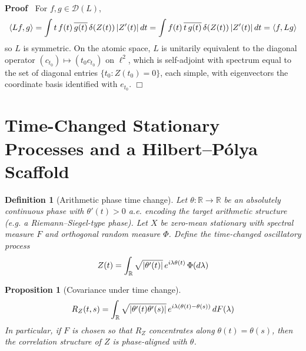 \documentclass{article}
\newenvironment{proof}{\noindent\textbf{Proof\ }}{\hspace*{\fill}$\Box$\medskip}
\newtheorem{definition}{Definition}
\newtheorem{proposition}{Proposition}
{\theorembodyfont{\rmfamily}\newtheorem{remark}{Remark}}
\begin{document}
\begin{proof}
  For $f, g \in \mathcal{D} (L)$,
  \begin{equation}
    \langle Lf, g \rangle = \int t \hspace{0.17em} f (t) \hspace{0.17em}
    \overline{g (t)} \hspace{0.17em} \delta (Z (t)) \hspace{0.17em} |Z' (t) | 
    \hspace{0.17em} dt = \int f (t) \hspace{0.17em} \overline{t
    \hspace{0.17em} g (t)} \hspace{0.17em} \delta (Z (t)) \hspace{0.17em} |Z'
    (t) |  \hspace{0.17em} dt = \langle f, Lg \rangle
  \end{equation}
  so $L$ is symmetric. On the atomic space, $L$ is unitarily equivalent to the
  diagonal operator $(c_{t_0}) \mapsto (t_0 c_{t_0})$ on $\ell^2$, which is
  self-adjoint with spectrum equal to the set of diagonal entries $\{t_0 : Z
  (t_0) = 0\}$, each simple, with eigenvectors the coordinate basis identified
  with $e_{t_0}$.
\end{proof}

\section{Time-Changed Stationary Processes and a Hilbert--P{\'o}lya Scaffold}

\begin{definition}
  [Arithmetic phase time change] Let $\theta : \mathbb{R} \to \mathbb{R}$ be
  an absolutely continuous phase with $\theta' (t) > 0$ a.e. encoding the
  target arithmetic structure (e.g. a Riemann--Siegel-type phase). Let $X$ be
  zero-mean stationary with spectral measure $F$ and orthogonal random measure
  $\Phi$. Define the time-changed oscillatory process
  \begin{equation}
    Z (t) = \int_{\mathbb{R}} \sqrt{| \theta' (t) |}  \hspace{0.17em} e^{i
    \lambda \theta (t)}  \hspace{0.17em} \Phi (d \lambda)
  \end{equation}
\end{definition}

\begin{proposition}
  [Covariance under time change]
  \begin{equation}
    R_Z (t, s) = \int_{\mathbb{R}} \sqrt{| \theta' (t) \theta' (s) |} 
    \hspace{0.17em} e^{i \lambda (\theta (t) - \theta (s))}  \hspace{0.17em}
    dF (\lambda)
  \end{equation}
  In particular, if $F$ is chosen so that $R_Z$ concentrates along $\theta (t)
  = \theta (s)$, then the correlation structure of $Z$ is phase-aligned with
  $\theta$.
\end{proposition}
\end{document}
